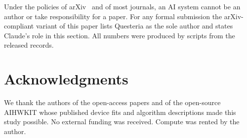Under the policies of arXiv~\cite{arxiv_policy} and of most journals, an AI system cannot be an author or take responsibility
for a paper. For any formal submission the arXiv-compliant variant of this paper lists Questeria as the sole author and states
Claude's role in this section. All numbers were produced by scripts from the released records.
\fi

\section*{Acknowledgments}
We thank the authors of the open-access papers and of the open-source AIHWKIT whose published device fits and algorithm
descriptions made this study possible. No external funding was received. Compute was rented by the author.




\appendix




